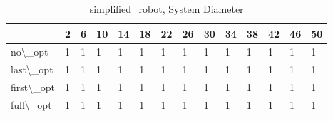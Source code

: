\begin{table}
\centering
\caption{simplified\_robot, System Diameter}
\label{simplified_robot_diam}
\begin{tabular}{llllllllllllll}
\toprule
{} &  2 &  6 & 10 & 14 & 18 & 22 & 26 & 30 & 34 & 38 & 42 & 46 & 50 \\
\midrule
no\textbackslash \_opt    &  1 &  1 &  1 &  1 &  1 &  1 &  1 &  1 &  1 &  1 &  1 &  1 &  1 \\
last\textbackslash \_opt  &  1 &  1 &  1 &  1 &  1 &  1 &  1 &  1 &  1 &  1 &  1 &  1 &  1 \\
first\textbackslash \_opt &  1 &  1 &  1 &  1 &  1 &  1 &  1 &  1 &  1 &  1 &  1 &  1 &  1 \\
full\textbackslash \_opt  &  1 &  1 &  1 &  1 &  1 &  1 &  1 &  1 &  1 &  1 &  1 &  1 &  1 \\
\bottomrule
\end{tabular}
\end{table}
